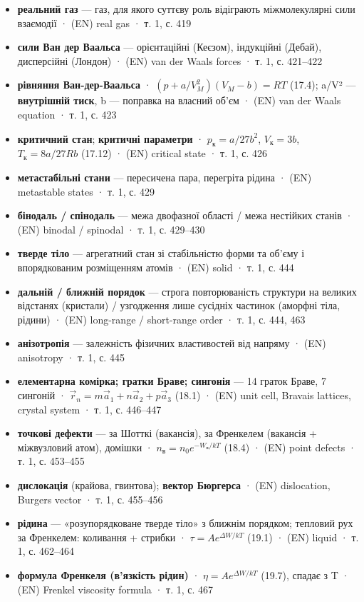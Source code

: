\documentclass[11pt,a4paper,oneside]{book}
\newcommand{\book}{}
\begin{document}
\begin{itemize}
\item \textbf{реальний газ} — газ, для якого суттєву роль відіграють міжмолекулярні сили взаємодії · (EN) real gas · \book{} т. 1, с. 419
\item \textbf{сили Ван дер Ваальса} — орієнтаційні (Кеєзом), індукційні (Дебай), дисперсійні (Лондон) · (EN) van der Waals forces · \book{} т. 1, с. 421–422
\item \textbf{рівняння Ван-дер-Ваальса} · $(p + a/V_M^2)(V_M - b) = RT$ (17.4); a/V² — \textbf{внутрішній тиск}, b — поправка на власний об'єм · (EN) van der Waals equation · \book{} т. 1, с. 423
\item \textbf{критичний стан}; \textbf{критичні параметри} · $p_\text{к} = a/27b^2$, $V_\text{к} = 3b$, $T_\text{к} = 8a/27Rb$ (17.12) · (EN) critical state · \book{} т. 1, с. 426
\item \textbf{метастабільні стани} — пересичена пара, перегріта рідина · (EN) metastable states · \book{} т. 1, с. 429
\item \textbf{бінодаль / спінодаль} — межа двофазної області / межа нестійких станів · (EN) binodal / spinodal · \book{} т. 1, с. 429–430
\item \textbf{тверде тіло} — агрегатний стан зі стабільністю форми та об'єму і впорядкованим розміщенням атомів · (EN) solid · \book{} т. 1, с. 444
\item \textbf{дальній / ближній порядок} — строга повторюваність структури на великих відстанях (кристали) / узгодження лише сусідніх частинок (аморфні тіла, рідини) · (EN) long-range / short-range order · \book{} т. 1, с. 444, 463
\item \textbf{анізотропія} — залежність фізичних властивостей від напряму · (EN) anisotropy · \book{} т. 1, с. 445
\item \textbf{елементарна комірка; гратки Браве; сингонія} — 14 граток Браве, 7 сингоній · $\vec r_n = m\vec a_1 + n\vec a_2 + p\vec a_3$ (18.1) · (EN) unit cell, Bravais lattices, crystal system · \book{} т. 1, с. 446–447
\item \textbf{точкові дефекти} — за Шотткі (вакансія), за Френкелем (вакансія + міжвузловий атом), домішки · $n_{\text{в}} = n_0e^{-W_{\text{в}}/kT}$ (18.4) · (EN) point defects · \book{} т. 1, с. 453–455
\item \textbf{дислокація} (крайова, гвинтова); \textbf{вектор Бюргерса} · (EN) dislocation, Burgers vector · \book{} т. 1, с. 455–456
\item \textbf{рідина} — «розупорядковане тверде тіло» з ближнім порядком; тепловий рух за Френкелем: коливання + стрибки · $\tau = Ae^{\Delta W/kT}$ (19.1) · (EN) liquid · \book{} т. 1, с. 462–464
\item \textbf{формула Френкеля (в'язкість рідин)} · $\eta = Ae^{\Delta W/kT}$ (19.7), спадає з T · (EN) Frenkel viscosity formula · \book{} т. 1, с. 467
\end{itemize}
\end{document}
